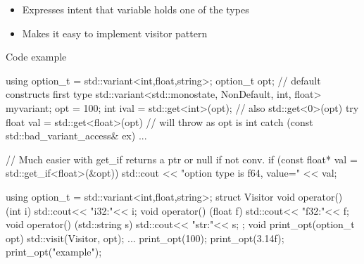 \begin{frame}[fragile]
  \begin{itemize}
  \item Expresses intent that variable holds one of the types
  \item Makes it easy to implement visitor pattern
  \end{itemize}

  \begin{exampleblock}{Code example}
    \begin{cppcode*}{}
      using option_t = std::variant<int,float,string>;
      option_t opt; // default constructs first type
      std::variant<std::monostate, NonDefault, int, float> myvariant;
      opt = 100;
      int ival = std::get<int>(opt); // also std::get<0>(opt)
      try {
        float val = std::get<float>(opt) // will throw as opt is int
      } catch (const std::bad_variant_access& ex) {...}

      // Much easier with get_if returns a ptr or null if not conv.
      if (const float* val = std::get_if<float>(&opt))
          std::cout << "option type is f64, value=" << val;
    \end{cppcode*}
  \end{exampleblock}

\end{frame}

\begin{frame}[fragile]
    \begin{cppcode*}{}
      using option_t = std::variant<int,float,string>;
      struct Visitor {
        void operator() (int i) { std::cout<< "i32:"<< i;}
        void operator() (float f) { std::cout<< "f32:"<< f;}
        void operator() (std::string s) { std::cout<< "str:"<< s;}
      };
      void print_opt(option_t opt) {
        std::visit(Visitor{}, opt);
      }
      ...
      print_opt(100); print_opt(3.14f); print_opt("example");
    \end{cppcode*}
\end{frame}

